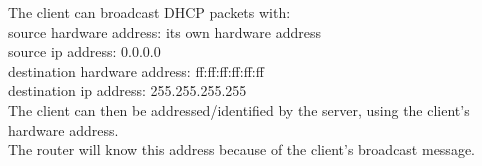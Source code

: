 The client can broadcast DHCP packets with: \\
source hardware address: its own hardware address \\
source ip address: 0.0.0.0 \\

destination hardware address: ff:ff:ff:ff:ff:ff \\
destination ip address: 255.255.255.255 \\

The client can then be addressed/identified by the server, using the client's hardware address. \\
The router will know this address because of the client's broadcast message. \\
